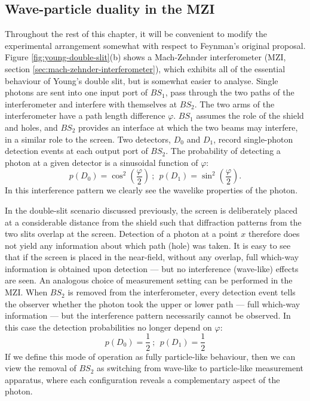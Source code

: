
\subsection{Wave-particle duality in the MZI}
Throughout the rest of this chapter, it will be convenient to modify the experimental arrangement somewhat with respect to Feynman's original proposal. Figure \ref{fig:young-double-slit}(b) shows a Mach-Zehnder interferometer (MZI, section \ref{sec:mach-zehnder-interferometer}), which exhibits all of the essential behaviour of Young's double slit, but is somewhat easier to analyse. Single photons are sent into one input port of $BS_1$, pass through the two paths of the interferometer and interfere with themselves at $BS_2$. 
The two arms of the interferometer have a path length difference $\varphi$.
$BS_1$ assumes the role of the shield and holes, and $BS_2$ provides an interface at which the two beams may interfere, in a similar role to the screen. Two detectors, $D_0$ and $D_1$, record single-photon detection events at each output port of $BS_2$. The probability of detecting a photon at a given detector is a sinusoidal function of $\varphi$:
\begin{equation}
    p(D_0)=\cos^2\left(\frac{\varphi}{2} \right)~;~~ p(D_1)=\sin^2\left(\frac{\varphi}{2} \right).
\end{equation}
In this interference pattern we clearly see the wavelike properties of the photon. 

In the double-slit scenario discussed previously, the screen is deliberately placed at a considerable distance from the shield such that diffraction patterns from the two slits overlap at the screen. Detection of a photon at a point $x$ therefore does not yield any information about which path (hole) was taken. It is easy to see that if the screen is placed in the near-field, without any overlap, full which-way information is obtained upon detection --- but no interference (wave-like) effects are seen. An analogous choice of measurement setting can be performed in the MZI. When $BS_2$ is removed from the interferometer, every detection event tells the observer whether the photon took the upper or lower path --- full which-way information --- but the interference pattern necessarily cannot be observed. In this case the detection probabilities no longer depend on $\varphi$:
\begin{equation}
    p(D_0)=\frac{1}{2}~;~~ p(D_1)=\frac{1}{2}
\end{equation}
If we define this mode of operation as fully particle-like behaviour, then we can view the removal of $BS_2$ as switching from wave-like to particle-like measurement apparatus, where each configuration reveals a complementary aspect of the photon.

